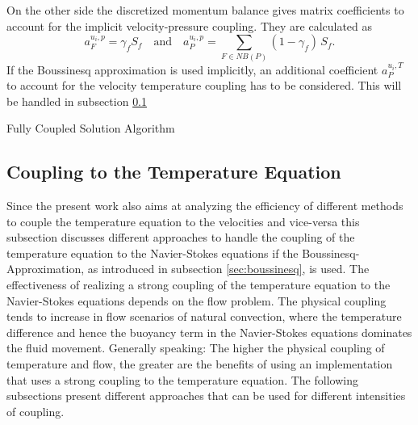 On the other side the discretized momentum balance gives matrix coefficients to account for the implicit velocity-pressure coupling. They are calculated as
\begin{displaymath}
  a_F^{u_i,p} =  \gamma_f S_f \quad \text{and} \quad a_P^{u_i,p} = \sum_{F \in NB(P)} (1-\gamma_f) \, S_f.
\end{displaymath}
If the Boussinesq approximation is used implicitly, an additional coefficient \(a_P^{u_i,T}\) to account for the velocity temperature coupling has to be considered. This will be handled in subsection \ref{sec:temperaturecoupling}

\begin{algorithm}
\label{al:coupled}
\caption{Fully Coupled Solution Algorithm}
\begin{algorithmic}
\Else
\EndIf
{}
\EndIf
\EndWhile
\end{algorithmic}
\end{algorithm}

\subsection{Coupling to the Temperature Equation}
\label{sec:temperaturecoupling}

Since the present work also aims at analyzing the efficiency of different methods to couple the temperature equation to the velocities and vice-versa this subsection discusses different approaches to handle the coupling of the temperature equation to the Navier-Stokes equations if the Boussinesq-Approximation, as introduced in subsection \ref{sec:boussinesq}, is used. The effectiveness of realizing a strong coupling of the temperature equation to the Navier-Stokes equations depends on the flow problem. The physical coupling tends to increase in flow scenarios of natural convection, where the temperature difference and hence the buoyancy term in the Navier-Stokes equations dominates the fluid movement. Generally speaking: The higher the physical coupling of temperature and flow, the greater are the benefits of using an implementation that uses a strong coupling to the temperature equation. The following subsections present different approaches that can be used for different intensities of coupling.
      

